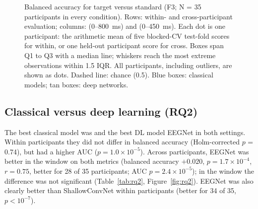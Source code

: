 \begin{figure}[H]
\centering
{}
\caption{Balanced accuracy for target versus standard (F3; N = 35 participants in every condition). Rows: within- and cross-participant evaluation; columns:  (0--800~ms) and  (0--450~ms). Each dot is one participant: the arithmetic mean of five blocked-CV test-fold scores for within, or one held-out participant score for cross. Boxes span Q1 to Q3 with a median line; whiskers reach the most extreme observations within 1.5 IQR. All participants, including outliers, are shown as dots. Dashed line: chance (0.5). Blue boxes: classical models; tan boxes: deep networks.}
\label{fig:rq1}
\end{figure}

\subsection{Classical versus deep learning (RQ2)}
\label{sec:res-rq2}
The best classical model was  and the best DL model EEGNet in both settings. Within participants they did not differ in balanced accuracy (Holm-corrected $p$ = 0.74), but  had a higher AUC ($p = 1.0 \times 10^{-5}$). Across participants, EEGNet was better in the  window on both metrics (balanced accuracy $+0.020$, $p = 1.7 \times 10^{-4}$, $r = 0.75$, better for 28 of 35 participants; AUC $p = 2.4 \times 10^{-5}$); in the  window the difference was not significant (Table~\ref{tab:rq2}, Figure~\ref{fig:rq2}). EEGNet was also clearly better than ShallowConvNet within participants (better for 34 of 35, $p < 10^{-7}$).

